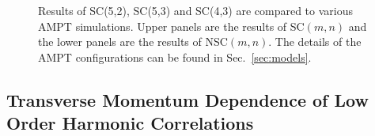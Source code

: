 \documentclass[ALICE,manyauthors]{cernphprep}
\begin{document}
\begin{figure}[p]
\begin{center}
        \caption{Results of  SC(5,2), SC(5,3) and SC(4,3) are compared to various AMPT simulations. Upper panels are the results of SC$(m,n)$ and the lower panels are the results of NSC$(m,n)$. The details of the AMPT configurations can be found in Sec.~\ref{sec:models}.}
        \label{fig:Figure_7}
        \end{center}   
 \end{figure}

\pagebreak
\subsection{Transverse Momentum Dependence of Low Order Harmonic Correlations}
\label{sec:ptdepsc}
\end{document}
